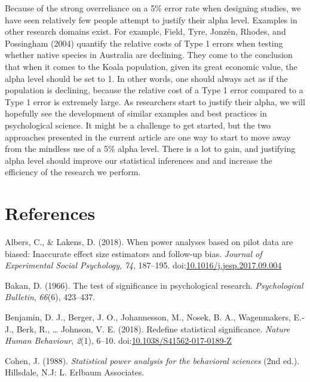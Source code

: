 \documentclass[,jou,floatsintext]{apa6}
\begin{document}
Because of the strong overreliance on a 5\% error rate when designing studies, we have seen relatively few people attempt to justify their alpha level. Examples in other research domains exist. For example, Field, Tyre, Jonzén, Rhodes, and Possingham (2004) quantify the relative costs of Type 1 errors when testing whether native species in Australia are declining. They come to the conclusion that when it comes to the Koala population, given its great economic value, the alpha level should be set to 1. In other words, one should always act as if the population is declining, because the relative cost of a Type 1 error compared to a Type 1 error is extremely large. As researchers start to justify their alpha, we will hopefully see the development of similar examples and best practices in psychological science. It might be a challenge to get started, but the two approaches presented in the current article are one way to start to move away from the mindless use of a 5\% alpha level. There is a lot to gain, and justifying alpha level should improve our statistical inferences and and increase the efficiency of the research we perform.

\hypertarget{references}{%
\section{References}\label{references}}

\setlength{\parindent}{-0.5in}
\setlength{\leftskip}{0.5in}

\hypertarget{refs}{}
\leavevmode\hypertarget{ref-albers_when_2018}{}%
Albers, C., \& Lakens, D. (2018). When power analyses based on pilot data are biased: Inaccurate effect size estimators and follow-up bias. \emph{Journal of Experimental Social Psychology}, \emph{74}, 187--195. doi:\href{https://doi.org/10.1016/j.jesp.2017.09.004}{10.1016/j.jesp.2017.09.004}

\leavevmode\hypertarget{ref-bakan_test_1966}{}%
Bakan, D. (1966). The test of significance in psychological research. \emph{Psychological Bulletin}, \emph{66}(6), 423--437.

\leavevmode\hypertarget{ref-benjamin_redefine_2018}{}%
Benjamin, D. J., Berger, J. O., Johannesson, M., Nosek, B. A., Wagenmakers, E.-J., Berk, R., \ldots{} Johnson, V. E. (2018). Redefine statistical significance. \emph{Nature Human Behaviour}, \emph{2}(1), 6--10. doi:\href{https://doi.org/10.1038/S41562-017-0189-Z}{10.1038/S41562-017-0189-Z}

\leavevmode\hypertarget{ref-cohen_statistical_1988}{}%
Cohen, J. (1988). \emph{Statistical power analysis for the behavioral sciences} (2nd ed.). Hillsdale, N.J: L. Erlbaum Associates.
\end{document}
